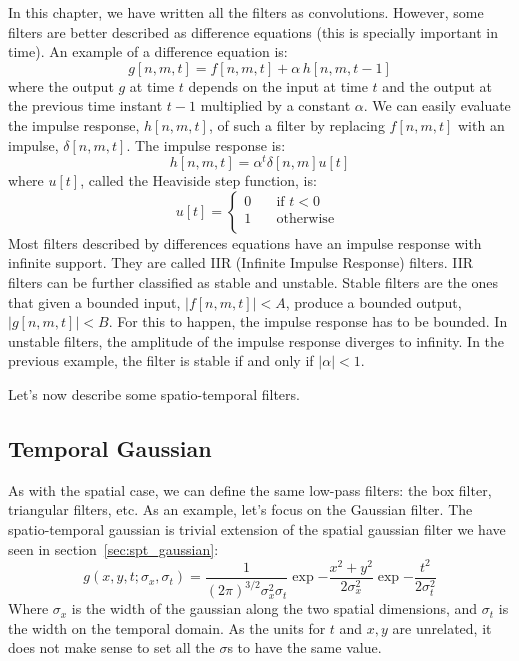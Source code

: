 In this chapter, we have written all the filters as convolutions. However, some filters are better described as difference equations (this is specially important in time). An example of a difference equation is:
\begin{equation}
    g \left[n,m,t \right] = f \left[n,m,t \right] + \alpha \, h \left[n,m,t-1 \right]
\end{equation}
where the output $g$ at time $t$ depends on the input at time $t$ and the output at the previous time instant $t-1$ multiplied by a constant $\alpha$. We can easily evaluate the impulse response, $h \left[n,m,t \right]$, of such a filter by replacing $f\left[n,m,t \right]$ with an impulse, $\delta \left[n,m,t \right]$. The impulse response is:
\begin{equation}
    h \left[n,m,t \right] = \alpha^t  \delta \left[n,m \right] u \left[t \right]
\end{equation}
where $u\left[t \right]$, called the Heaviside step function, is:
\begin{equation}
    u \left[t \right] = \begin{cases}
        0 & \quad \text{if }  t <0  \\
        1 & \quad \text{otherwise } \\
    \end{cases}
\end{equation}
Most filters described by differences equations have an impulse response with infinite support. They are called IIR (Infinite Impulse Response) filters. IIR filters can be further classified as stable and unstable. Stable filters are the ones that given a bounded input, $| f \left[n,m,t \right] |<A$, produce a bounded output, $| g \left[n,m,t \right] | <B$. For this to happen, the impulse response has to be bounded. In unstable filters, the amplitude of the impulse response diverges to infinity. In the previous example, the filter is stable if and only if $| \alpha | < 1$.

Let's now describe some spatio-temporal filters.


\subsection{Temporal Gaussian}

As with the spatial case, we can define the same low-pass filters: the box filter, triangular filters, etc.  As an example, let's focus on the Gaussian filter. The spatio-temporal gaussian is trivial extension of the spatial gaussian filter we have seen in section~\ref{sec:spt_gaussian}:
\begin{equation}
    g(x,y,t; \sigma_x,\sigma_t) = \frac{1}{(2 \pi)^{3/2} \sigma_x^2\sigma_t} \exp{-\frac{x^2 +
            y^2}{2 \sigma_x^2}} \exp{-\frac{t^2}{2 \sigma_t^2}}
    \label{eq:gauss3dcont}
\end{equation}
Where $\sigma_x$ is the width of the gaussian along the two spatial dimensions, and $\sigma_t$ is the width on the temporal domain. As the units for $t$ and $x,y$ are unrelated, it does not make sense to set all the $\sigma$s to have the same value.

